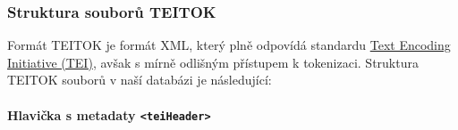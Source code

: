 \documentclass[
]{article}
\begin{document}
\hypertarget{struktura-souborux16f-teitok}{%
\subsubsection{Struktura souborů
TEITOK}\label{struktura-souborux16f-teitok}}

Formát TEITOK je formát XML, který plně odpovídá standardu
\href{https://www.tei-c.org/}{Text Encoding Initiative (TEI)}, avšak s
mírně odlišným přístupem k tokenizaci. Struktura TEITOK souborů v naší
databázi je následující:

\hypertarget{hlaviux10dka-s-metadaty-teiheader}{%
\paragraph{\texorpdfstring{Hlavička s metadaty
\texttt{\textless{}teiHeader\textgreater{}}}{Hlavička s metadaty \textless teiHeader\textgreater{}}}\label{hlaviux10dka-s-metadaty-teiheader}}
\end{document}
